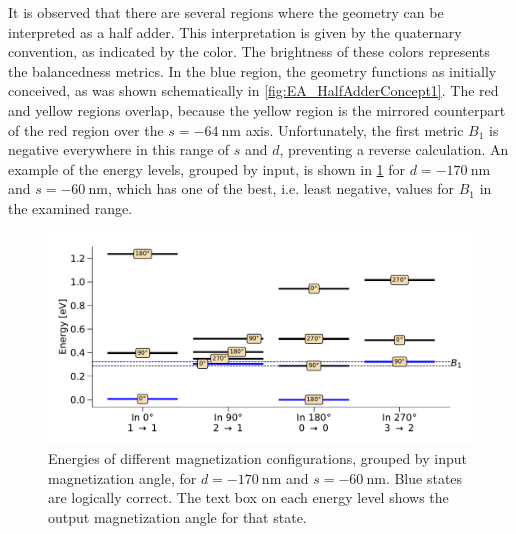 \documentclass[twocolumn]{phdsymp}
\begin{document}
It is observed that there are several regions where the geometry can be interpreted as a half adder. This interpretation is given by the quaternary convention, as indicated by the color. The brightness of these colors represents the balancedness metrics. In the blue region, the geometry functions as initially conceived, as was shown schematically in \cref{fig:EA_HalfAdderConcept1}. The red and yellow regions overlap, because the yellow region is the mirrored counterpart of the red region over the $s=\SI{-64}{\nano\metre}$ axis. Unfortunately, the first metric $B_1$ is negative everywhere in this range of $s$ and $d$, preventing a reverse calculation. An example of the energy levels, grouped by input, is shown in \cref{fig:EA_HalfAdderLevels1} for $d=\SI{-170}{\nano\metre}$ and $s=\SI{-60}{\nano\metre}$, which has one of the best, i.e. least negative, values for $B_1$ in the examined range. \par
\begin{figure}
    \centering
    \includegraphics[width=\columnwidth]{Figures/table(d170,s-60)_energylevels.pdf}
    \caption{Energies of different magnetization configurations, grouped by input magnetization angle, for $d=\SI{-170}{\nano\metre}$ and $s=\SI{-60}{\nano\metre}$. Blue states are logically correct. The text box on each energy level shows the output magnetization angle for that state.}
    \label{fig:EA_HalfAdderLevels1}
\end{figure}
\end{document}
